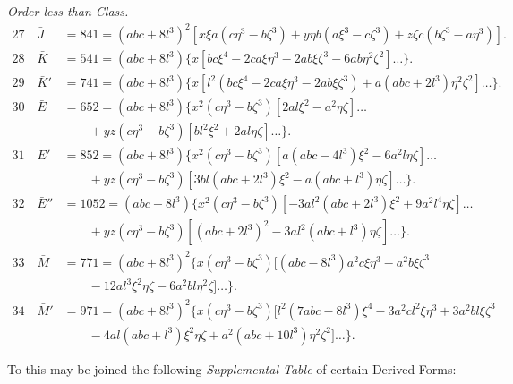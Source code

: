 \documentclass[11pt,a4paper]{article}
\begin{document}
\noindent\textit{Order less than Class.}
\begin{align*}
  27\quad \bar J &= 841 = (abc+8l^{3})^{2}[x\xi a(c\eta^{3}-b\zeta^{3})+y\eta b(a\xi^{3}-c\zeta^{3})+z\zeta c(b\zeta^{3}-a\eta^{3})].\\
  28\quad \bar K &= 541 = (abc+8l^{3})\{x[bc\xi^{4}-2ca\xi\eta^{3}-2ab\xi\zeta^{3}-6ab\eta^{2}\zeta^{2}]\ldots\}.\\
  29\quad \bar K' &= 741 = (abc+8l^{3})\{x[l^{2}(bc\xi^{4}-2ca\xi\eta^{3}-2ab\xi\zeta^{3})+a(abc+2l^{3})\eta^{2}\zeta^{2}]\ldots\}.\\
  30\quad \bar E &= 652 = (abc+8l^{3})\{x^{2}(c\eta^{3}-b\zeta^{3})[2al\xi^{2}-a^{2}\eta\zeta]\ldots\\
   &\qquad +yz(c\eta^{3}-b\zeta^{3})[bl^{2}\xi^{2}+2al\eta\zeta]\ldots\}.\\
  31\quad \bar E' &= 852 = (abc+8l^{3})\{x^{2}(c\eta^{3}-b\zeta^{3})[a(abc-4l^{3})\xi^{2}-6a^{2}l\eta\zeta]\ldots\\
   &\qquad +yz(c\eta^{3}-b\zeta^{3})[3bl(abc+2l^{3})\xi^{2}-a(abc+l^{3})\eta\zeta]\ldots\}.\\
  32\quad \bar E'' &= 1052 = (abc+8l^{3})\{x^{2}(c\eta^{3}-b\zeta^{3})[-3al^{2}(abc+2l^{3})\xi^{2}+9a^{2}l^{4}\eta\zeta]\ldots\\
   &\qquad +yz(c\eta^{3}-b\zeta^{3})[(abc+2l^{3})^{2}-3al^{2}(abc+l^{3})\eta\zeta]\ldots\}.\\
  33\quad \bar M &= 771 = (abc+8l^{3})^{2}\{x(c\eta^{3}-b\zeta^{3})[(abc-8l^{3})a^{2}c\xi\eta^{3}-a^{2}b\xi\zeta^{3}\\
   &\qquad -12al^{3}\xi^{2}\eta\zeta-6a^{2}bl\eta^{2}\zeta]\ldots\}.\\
  34\quad \bar M' &= 971 = (abc+8l^{3})^{2}\{x(c\eta^{3}-b\zeta^{3})[l^{2}(7abc-8l^{3})\xi^{4}-3a^{2}cl^{2}\xi\eta^{3}+3a^{2}bl\xi\zeta^{3}\\
   &\qquad -4al(abc+l^{3})\xi^{2}\eta\zeta+a^{2}(abc+10l^{3})\eta^{2}\zeta^{2}]\ldots\}.
\end{align*}

\newpage
\noindent
To this may be joined the following \textit{Supplemental Table} of
certain Derived Forms:
\end{document}
